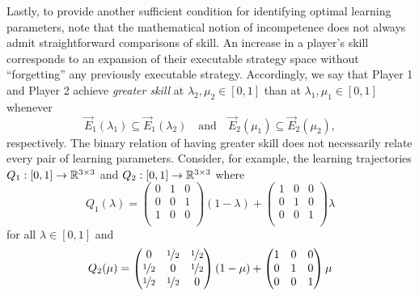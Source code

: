     Lastly, to provide another sufficient condition for identifying optimal learning parameters, note that the mathematical notion of incompetence does not always admit straightforward comparisons of skill.
    An increase in a player's skill corresponds to an expansion of their executable strategy space without ``forgetting'' any previously executable strategy.
    Accordingly, we say that Player 1 and Player 2 achieve \emph{greater skill} at $\lambda_2, \mu_2 \in [0, 1]$ than at $\lambda_1, \mu_1 \in [0, 1]$ whenever
    \begin{equation}  \label{eq:skill-comparison}
        \vec{E}_1(\lambda_1)
            \subseteq \vec{E}_1(\lambda_2)
        \quad\text{and}\quad
        \vec{E}_2(\mu_1)
            \subseteq \vec{E}_2(\mu_2),
    \end{equation}
    respectively.
    The binary relation of having greater skill does not necessarily relate every pair of learning parameters.
    Consider, for example, the learning trajectories $Q_1 : [0, 1] \to \mathbb{R}^{3 \times 3}$ and $Q_2 : [0, 1] \to \mathbb{R}^{3 \times 3}$ where
    \[
        Q_1(\lambda)
            =
            \begin{pmatrix}
                0 & 1 & 0 \\
                0 & 0 & 1 \\
                1 & 0 & 0 \\
            \end{pmatrix}
            (1 - \lambda) +
            \begin{pmatrix}
                1 & 0 & 0 \\
                0 & 1 & 0 \\
                0 & 0 & 1 \\
            \end{pmatrix}
            \lambda
    \]
    for all $\lambda \in [0, 1]$ and
    \[
        Q_2(\mu)
            =
            \begin{pmatrix}
                0 & \nicefrac{1}{2} & \nicefrac{1}{2} \\
                \nicefrac{1}{2} & 0 & \nicefrac{1}{2} \\
               \nicefrac{1}{2} & \nicefrac{1}{2} & 0 \\
            \end{pmatrix}
            (1 - \mu) +
            \begin{pmatrix}
                1 & 0 & 0 \\
                0 & 1 & 0 \\
                0 & 0 & 1 \\
            \end{pmatrix}
            \mu
    \]

